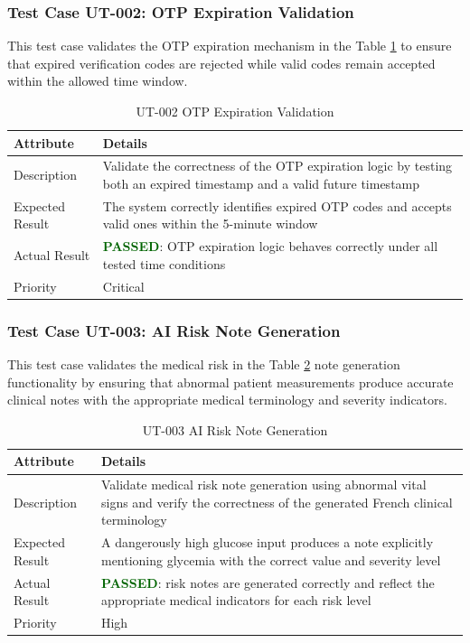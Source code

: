 \subsubsection{Test Case UT-002: OTP Expiration Validation}

This test case validates the OTP expiration mechanism in the Table \ref{tab:ut002} to ensure that expired verification codes are rejected while valid codes remain accepted within the allowed time window.

\begin{table}[H]
\centering
\caption{UT-002 OTP Expiration Validation}
\label{tab:ut002}
\renewcommand{\arraystretch}{1.3}

\begin{tabular}{|p{2cm}|p{13cm}|}
\hline
\rowcolor{gray!20}
\textbf{Attribute} & \textbf{Details} \\
\hline
Description & Validate the correctness of the OTP expiration logic by testing both an expired timestamp and a valid future timestamp \\
\hline
Expected Result & The system correctly identifies expired OTP codes and accepts valid ones within the 5-minute window \\
\hline
Actual Result & \textbf{\textcolor{darkgreen}{PASSED}}: OTP expiration logic behaves correctly under all tested time conditions \\
\hline
Priority & Critical \\
\hline
\end{tabular}
\end{table}
\subsubsection{Test Case UT-003: AI Risk Note Generation}

This test case validates the medical risk in the Table \ref{tab:ut003} note generation functionality by ensuring that abnormal patient measurements produce accurate clinical notes with the appropriate medical terminology and severity indicators.

\begin{table}[H]
\centering
\caption{UT-003 AI Risk Note Generation}
\label{tab:ut003}
\renewcommand{\arraystretch}{1.3}

\begin{tabular}{|p{2cm}|p{13cm}|}
\hline
\rowcolor{gray!20}
\textbf{Attribute} & \textbf{Details} \\
\hline
Description & Validate medical risk note generation using abnormal vital signs and verify the correctness of the generated French clinical terminology \\
\hline
Expected Result & A dangerously high glucose input produces a note explicitly mentioning glycemia with the correct value and severity level \\
\hline
Actual Result & \textbf{\textcolor{darkgreen}{PASSED}}: risk notes are generated correctly and reflect the appropriate medical indicators for each risk level \\
\hline
Priority & High \\
\hline
\end{tabular}
\end{table}

